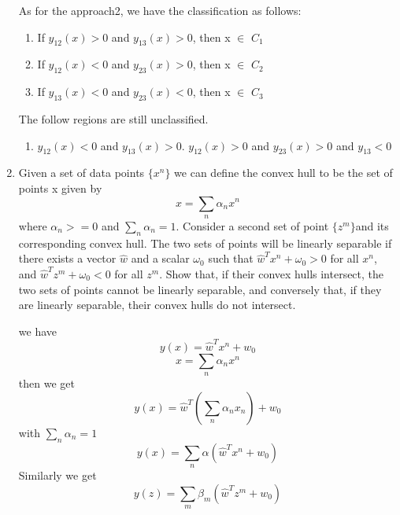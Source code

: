 \documentclass[a4paper]{article}
\begin{document}
\begin{enumerate}
\begin{solution}
		As for the approach2, we have the classification as follows:
		\begin{enumerate}
			\item
			If $ y_{12}(x) > 0 $ and $ y_{13}(x) > 0 $, then x $\in$ $ C_1 $
			\item
			If $ y_{12}(x) < 0 $ and $ y_{23}(x) > 0 $, then x $\in$ $ C_2 $
			\item
			If $ y_{13}(x) < 0 $ and $ y_{23}(x) < 0 $, then x $\in$ $ C_3 $
		\end{enumerate}
		The follow regions are still unclassified.
		\begin{enumerate}
			\item
			$y_{12}(x) < 0$ and $y_{13}(x) > 0$.
			$y_{12}(x) > 0$ and $y_{23}(x) > 0$ and $y_{13} < 0$
		\end{enumerate}
		\end{solution}
		\item
		Given a set of data points $\{x^n\}$ we can define the convex hull to be the set of points x given by
		\begin{equation*}
			x = \sum_n \alpha_n x^n
		\end{equation*}
		where $\alpha_n >=0$ and $\sum_n \alpha_n = 1$. Consider a second set of point $\{z^m\}$and its corresponding convex hull. The two sets of points will be linearly separable if there exists a vector $\hat{w}$ and a scalar $\omega_0$ such that $\hat{w}^Tx^n+\omega_0 >0$ for all $x^n$, and $\hat{w}^Tz^m + \omega_0<0$ for all $z^m$. Show that, if their convex hulls intersect, the two sets of points cannot be linearly separable, and conversely that, if they are linearly separable, their convex hulls do not intersect.
		\begin{solution}
			we have
			\begin{equation*}
				y(x) = \hat{w}^Tx^n + w_0
			\end{equation*}
			\begin{equation*}
				x = \sum_{n} \alpha_nx^n
			\end{equation*}
			then we get
			\begin{equation*}
				y(x) = \hat{w}^T(\sum_{n}\alpha_nx_n)+w_0
			\end{equation*}
			with $ \sum_{n}\alpha_n = 1 $
			\begin{equation*}
				y(x) = \sum_{n}\alpha(\hat{w}^Tx^n+w_0)
			\end{equation*}
			Similarly we get
			\begin{equation*}
				y(z) = \sum_{m} \beta_m(\hat{w}^Tz^m + w_0)
			\end{equation*}

\end{solution}
\end{enumerate}
\end{document}
